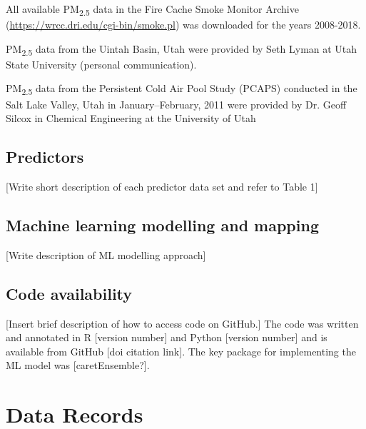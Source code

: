 \documentclass[english]{article}
\begin{document}
All available PM\textsubscript{2.5} data in the Fire Cache Smoke Monitor Archive (\url{https://wrcc.dri.edu/cgi-bin/smoke.pl}) was downloaded for the years 2008-2018. 

PM\textsubscript{2.5} data from the Uintah Basin, Utah were provided by Seth Lyman at Utah State University (personal communication).

PM\textsubscript{2.5} data from the Persistent Cold Air Pool Study (PCAPS) \cite{Silcox_wintertime_2012} conducted in the Salt Lake Valley, Utah in January--February, 2011 were provided by Dr. Geoff Silcox in Chemical Engineering at the University of Utah


\subsection*{Predictors}

[Write short description of each predictor data set and refer to Table 1]

\subsection*{Machine learning modelling and mapping}

[Write description of ML modelling approach]

\subsection*{Code availability}


[Insert brief description of how to access code on GitHub.] The code was written and annotated in R [version number] and Python [version number] and is available from GitHub [doi citation link]. The key package for implementing the ML model was [caretEnsemble?]. 

\section*{Data Records}
\end{document}
